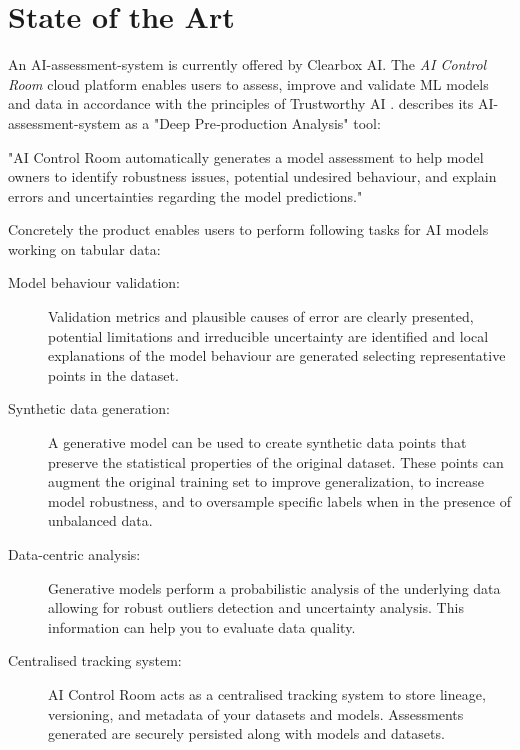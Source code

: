 \documentclass[11pt,a4paper,english]{scrreprt}
\begin{document}
\section{State of the Art}\label{section:state_of_the_art}
An AI-assessment-system is currently offered by Clearbox AI. The \textit{AI Control Room} cloud platform enables users to assess, improve and validate ML models and data in accordance with the principles of Trustworthy AI \parencite{clearbox_website,eu_trustworthy_ai}. \textcite{clearbox_website} describes its AI-assessment-system as a "Deep Pre‑production Analysis" tool:
\begin{displayquote}
    "AI Control Room automatically generates a model assessment to help model owners to identify robustness issues, potential undesired behaviour, and explain errors and uncertainties regarding the model predictions."
\end{displayquote}

Concretely the product enables users to perform following tasks for AI models working on tabular data:
\begin{description}
    \item [Model behaviour validation:] Validation metrics and plausible causes of error are clearly presented, potential limitations and irreducible uncertainty are identified and local explanations of the model behaviour are generated selecting representative points in the dataset.
    \item [Synthetic data generation:] A generative model can be used to create synthetic data points that preserve the statistical properties of the original dataset. These points can augment the original training set to improve generalization, to increase model robustness, and to oversample specific labels when in the presence of unbalanced data.
    \item [Data-centric analysis:] Generative models perform a probabilistic analysis of the underlying data allowing for robust outliers detection and uncertainty analysis. This information can help you to evaluate data quality.
    \item [Centralised tracking system:] AI Control Room acts as a centralised tracking system to store lineage, versioning, and metadata of your datasets and models. Assessments generated are securely persisted along with models and datasets.
\end{description}
\end{document}
